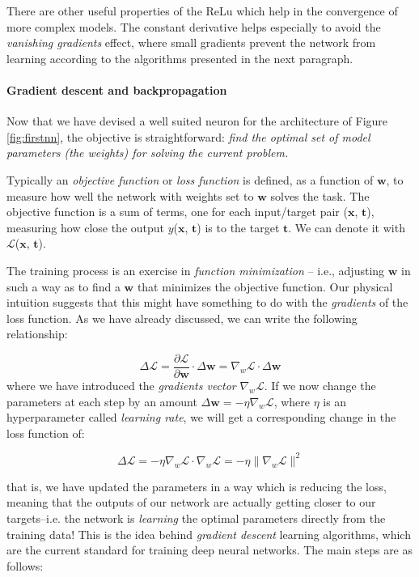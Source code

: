 There are other useful properties of the ReLu which help in the convergence of more complex models. The constant derivative helps especially to avoid the \emph{vanishing gradients} effect, where small gradients prevent the network from learning according to the algorithms presented in the next paragraph.

\paragraph{Gradient descent and backpropagation}

Now that we have devised a well suited neuron for the architecture of Figure \ref{fig:firstnn}, the objective is straightforward: \emph{find the optimal set of \emph{model parameters} (the weights) for solving the current problem.} 

Typically an \emph{objective function} or \emph{loss function} is defined, as a function
of $\mathbf{w}$, to measure how well the network with weights set to $\mathbf{w}$ solves the task. 
The objective function is a sum of terms, one for each input/target pair ($\mathbf{x}$, $\mathbf{t}$),
measuring how close the output $y$($\mathbf{x}$, $\mathbf{t}$) is to the target $\mathbf{t}$. We can denote it with $\mathcal{L}$($\mathbf{x}$, $\mathbf{t}$).

The training process is an exercise in \emph{function minimization} – i.e., adjusting $\mathbf{w}$ in such a way as to find a $\mathbf{w}$ that minimizes the objective function. Our physical intuition suggests that this might have something to do with the \emph{gradients} of the loss function. As we have already discussed, we can write the following relationship:

\[
    \Delta \mathcal{L} = \frac{\partial \mathcal{L}}{\partial \mathbf{w}} \cdot \Delta \mathbf{w} = \nabla_w \mathcal{L} \cdot \Delta \mathbf{w} 
\]
 where we have introduced the \emph{gradients vector} $\nabla_w \mathcal{L}$. If we now change the parameters at each step by an amount $ \Delta \mathbf{w} = - \eta \nabla_w \mathcal{L}$, where $\eta$ is an hyperparameter called \emph{learning rate}, we will get a corresponding change in the loss function of:
 
 \[
    \Delta \mathcal{L} = -\eta \nabla_w \mathcal{L} \cdot \nabla_w \mathcal{L} = - \eta \|  \nabla_w \mathcal{L} \|^2
\]

that is, we have updated the parameters in a way which is reducing the loss, meaning that the outputs of our network are actually getting closer to our targets--i.e. the network is \emph{learning} the optimal parameters directly from the training data! This is the idea behind \emph{gradient descent} learning algorithms, which are the current standard for training deep neural networks. The main steps are as follows:

